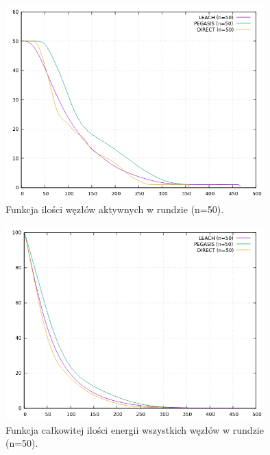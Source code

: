 \documentclass[a4paper,12pt,twoside,openany]{report}
\begin{document}
\begin{figure}[H]
 \centering
 \includegraphics[width=10cm]{images/gnuplot/test_2/nodes_in_round_50.png}
 \caption{Funkcja ilości węzłów aktywnych w rundzie (n=50).}
\end{figure}

\begin{figure}[H]
 \centering
 \includegraphics[width=10cm]{images/gnuplot/test_2/energy_in_round_50.png}
 \caption{Funkcja całkowitej ilości energii wszystkich węzłów w rundzie (n=50).}
\end{figure}
\end{document}

